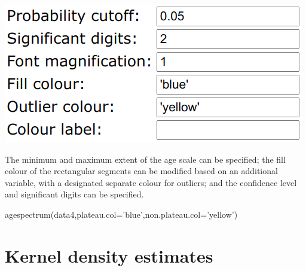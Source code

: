 \begin{refsection}
\begin{enumerate}
\noindent\begin{minipage}[t]{.4\linewidth}
  \strut\vspace*{-\baselineskip}\newline
  \includegraphics[width=\linewidth]{../figures/OtherAgeSpectrumExtraOptions.png}
\end{minipage}
\begin{minipage}[t]{.6\linewidth}
  The minimum and maximum extent of the age scale can be specified;
  the fill colour of the rectangular segments can be modified based on
  an additional variable, with a designated separate colour for
  outliers; and the confidence level and significant digits can be
  specified.
\end{minipage}

\begin{console}
agespectrum(data4,plateau.col='blue',non.plateau.col='yellow')
\end{console}
  
\end{enumerate}

\section{Kernel density estimates}\label{sec:OtherKDE}


\end{refsection}
